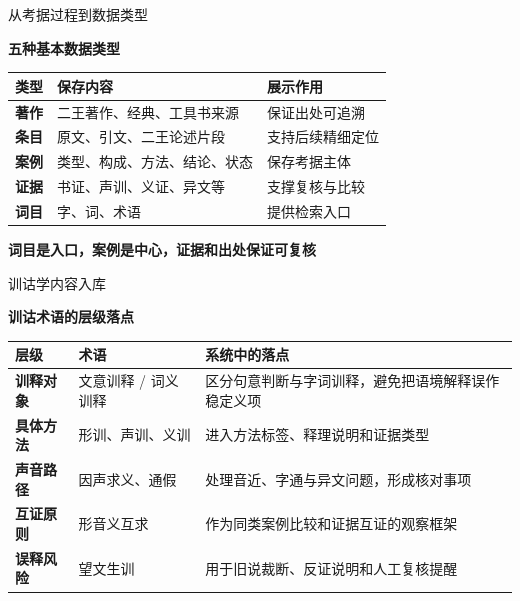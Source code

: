 \documentclass[aspectratio=169]{beamer}
\newcommand{\key}[1]{\textcolor{rucRed}{\textbf{#1}}}
\begin{document}
\begin{frame}{从考据过程到数据类型}
    \begin{center}
        \small\textbf{五种基本数据类型}
    \end{center}
    \vspace{-0.18cm}
    \begin{table}[h]
        \centering
        \small
        \begin{tabularx}{\textwidth}{>{\bfseries}l X X}
            \toprule
            类型 & 保存内容 & 展示作用 \\
            \midrule
            著作 & 二王著作、经典、工具书来源 & 保证出处可追溯 \\
            条目 & 原文、引文、二王论述片段 & 支持后续精细定位 \\
            案例 & 类型、构成、方法、结论、状态 & 保存考据主体 \\
            证据 & 书证、声训、义证、异文等 & 支撑复核与比较 \\
            词目 & 字、词、术语 & 提供检索入口 \\
            \bottomrule
        \end{tabularx}
    \end{table}
    \begin{center}
        \key{词目是入口，案例是中心，证据和出处保证可复核}
    \end{center}
\end{frame}

\begin{frame}{训诂学内容入库}
    \begin{center}
        \small\textbf{训诂术语的层级落点}
    \end{center}
    \vspace{-0.24cm}
    \begin{table}[h]
        \centering
        \small
        \begin{tabularx}{0.96\textwidth}{>{\bfseries}p{} p{} X}
            \toprule
            层级 & 术语 & 系统中的落点 \\
            \midrule
            训释对象 & 文意训释 / 词义训释 & 区分句意判断与字词训释，避免把语境解释误作稳定义项 \\
            具体方法 & 形训、声训、义训 & 进入方法标签、释理说明和证据类型 \\
            声音路径 & 因声求义、通假 & 处理音近、字通与异文问题，形成核对事项 \\
            互证原则 & 形音义互求 & 作为同类案例比较和证据互证的观察框架 \\
            误释风险 & 望文生训 & 用于旧说裁断、反证说明和人工复核提醒 \\
            \bottomrule
        \end{tabularx}
    \end{table}
\end{frame}
\end{document}

